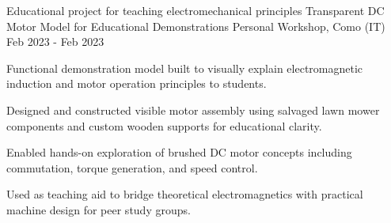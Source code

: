 
\cventry
{Educational project for teaching electromechanical principles}
{Transparent DC Motor Model for Educational Demonstrations}
{Personal Workshop, Como (IT)}
{Feb 2023 - Feb 2023}
{
    Functional demonstration model built to visually explain electromagnetic induction and motor operation principles to students.
    \newline
    \vspace{4mm}
    \begin{cvitems}
        \item {Designed and constructed visible motor assembly using salvaged lawn mower components and custom wooden supports for educational clarity.}
        \item {Enabled hands-on exploration of brushed DC motor concepts including commutation, torque generation, and speed control.}
        \item {Used as teaching aid to bridge theoretical electromagnetics with practical machine design for peer study groups.}
    \end{cvitems}
}
